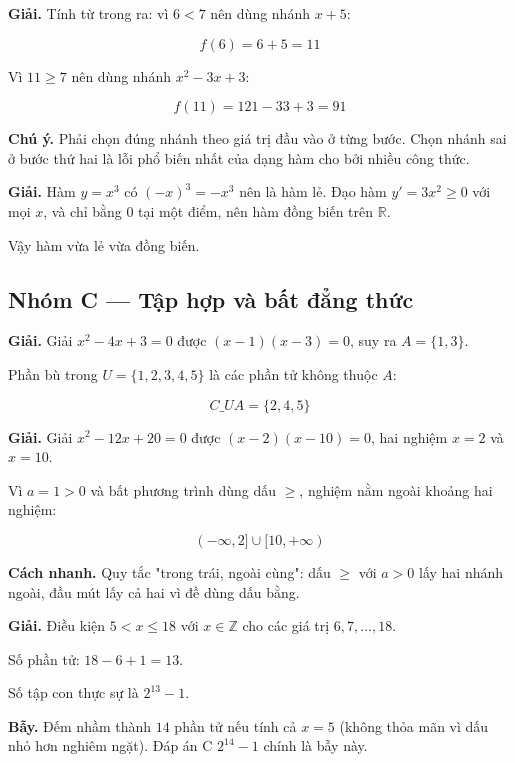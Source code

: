 \documentclass[11pt, a4paper]{article}
\begin{document}
\begin{dapan}[18 — Đáp án A]
\textbf{Giải.} Tính từ trong ra: vì $6 < 7$ nên dùng nhánh $x + 5$:

$$f(6) = 6 + 5 = 11$$

Vì $11 \ge 7$ nên dùng nhánh $x^2 - 3x + 3$:

$$f(11) = 121 - 33 + 3 = 91$$

\textbf{Chú ý.} Phải chọn đúng nhánh theo giá trị đầu vào ở từng bước. Chọn nhánh sai ở bước thứ hai là lỗi phổ biến nhất của dạng hàm cho bởi nhiều công thức.
\end{dapan}

\begin{dapan}[19 — Đáp án A]
\textbf{Giải.} Hàm $y = x^3$ có $(-x)^3 = -x^3$ nên là hàm lẻ. Đạo hàm $y' = 3x^2 \ge 0$ với mọi $x$, và chỉ bằng $0$ tại một điểm, nên hàm đồng biến trên $\mathbb{R}$.

Vậy hàm vừa lẻ vừa đồng biến.
\end{dapan}

\subsection*{Nhóm C — Tập hợp và bất đẳng thức}

\begin{dapan}[20 — Đáp án B]
\textbf{Giải.} Giải $x^2 - 4x + 3 = 0$ được $(x-1)(x-3) = 0$, suy ra $A = \{1, 3\}$.

Phần bù trong $U = \{1,2,3,4,5\}$ là các phần tử không thuộc $A$:

$$C\_U A = \{2, 4, 5\}$$
\end{dapan}

\begin{dapan}[21 — Đáp án C]
\textbf{Giải.} Giải $x^2 - 12x + 20 = 0$ được $(x-2)(x-10) = 0$, hai nghiệm $x = 2$ và $x = 10$.

Vì $a = 1 > 0$ và bất phương trình dùng dấu $\ge$, nghiệm nằm ngoài khoảng hai nghiệm:

$$(-\infty, 2] \cup [10, +\infty)$$

\textbf{Cách nhanh.} Quy tắc "trong trái, ngoài cùng": dấu $\ge$ với $a > 0$ lấy hai nhánh ngoài, đầu mút lấy cả hai vì đề dùng dấu bằng.
\end{dapan}

\begin{dapan}[22 — Đáp án B]
\textbf{Giải.} Điều kiện $5 < x \le 18$ với $x \in \mathbb{Z}$ cho các giá trị $6, 7, \dots, 18$.

Số phần tử: $18 - 6 + 1 = 13$.

Số tập con thực sự là $2^{13} - 1$.

\textbf{Bẫy.} Đếm nhầm thành $14$ phần tử nếu tính cả $x = 5$ (không thỏa mãn vì dấu nhỏ hơn nghiêm ngặt). Đáp án C $2^{14}-1$ chính là bẫy này.
\end{dapan}
\end{document}
